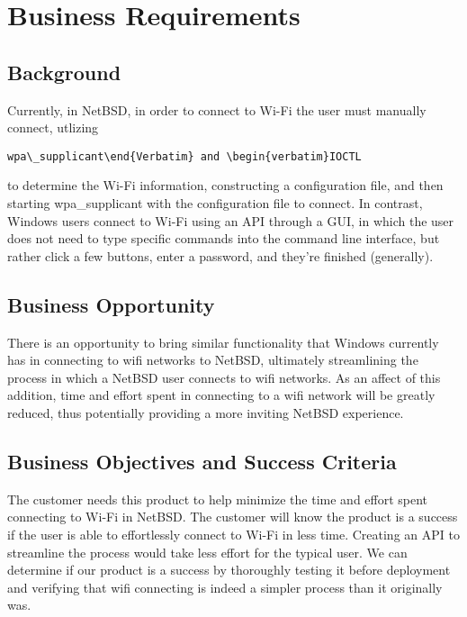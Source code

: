 \section{Business Requirements}
\subsection{Background}

Currently, in NetBSD, in order to connect to Wi-Fi the user must manually connect, utlizing \begin{verbatim}wpa\_supplicant\end{Verbatim} and \begin{verbatim}IOCTL\end{verbatim} to determine the Wi-Fi information, constructing a configuration file, and then starting wpa\_supplicant with the configuration file to connect.
In contrast, Windows users connect to Wi-Fi using an API through a GUI, in which the user does not need to type specific commands into the command line interface, but rather click a few buttons, enter a password, and they're finished (generally). 

\subsection{Business Opportunity}

There is an opportunity to bring similar functionality that Windows currently has in connecting to wifi networks to NetBSD, ultimately streamlining the process in which a NetBSD user connects to wifi networks. As an affect of this addition, time and effort spent in connecting to a wifi network will be greatly reduced, thus potentially providing a more inviting NetBSD experience.

\subsection{Business Objectives and Success Criteria}

The customer needs this product to help minimize the time and effort spent connecting to Wi-Fi in NetBSD. The customer will know the product is a success if 
the user is able to effortlessly connect to Wi-Fi in less time. Creating an API to streamline the process would take less effort for the typical user. 
We can determine if our product is a success by thoroughly testing it before deployment and verifying that wifi connecting is indeed a simpler process than it originally was.

